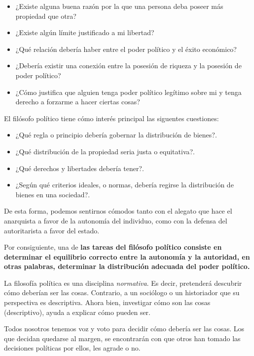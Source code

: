 {\color{blue}
\begin{itemize}
    \item ¿Existe alguna buena razón por la que una persona deba poseer más propiedad que otra?
    \item ¿Existe algún límite justificado a mi libertad?
    \item ¿Qué relación debería haber entre el poder político y el éxito económico?
    \item ¿Debería existir una conexión entre la posesión de riqueza y la posesión de poder político?
    \item ¿Cómo justifica que alguien tenga poder político legítimo sobre mi y tenga derecho a forzarme a hacer ciertas cosas?
\end{itemize}
}

El filósofo político tiene cómo interés principal las siguentes cuestiones:

{\color{blue}
\begin{itemize}
    \item ¿Qué regla o principio debería gobernar la distribución de bienes?.
    \item ¿Qué distribución de la propiedad seria justa o equitativa?.
    \item ¿Qué derechos y libertades debería tener?.
    \item ¿Según qué criterios ideales, o normas, debería regirse la distribución de bienes en una sociedad?.
\end{itemize}
}

De esta forma, podemos sentirnos cómodos tanto con el alegato que hace el anarquista a favor de la autonomía del individuo, como con la defensa del autoritarista a favor del estado. 

Por consiguiente, una de \textbf{las tareas del filósofo político consiste en determinar el equilibrio correcto entre la autonomía y la autoridad, en otras palabras, determinar la distribución adecuada del poder político.}

La filosofía política es una disciplina \textit{normativa}. Es decir, pretenderá descubrir cómo deberían ser las cosas. Contrario, a un sociólogo o un historiador que su perspectiva es descriptiva. Ahora bien, investigar cómo son las cosas (descriptivo), ayuda a explicar cómo pueden ser.


Todos nosotros tenemos voz y voto para decidir cómo debería ser las cosas. Los que decidan quedarse al margen, se encontrarán con que otros han tomado las decisiones políticas por ellos, les agrade o no.

